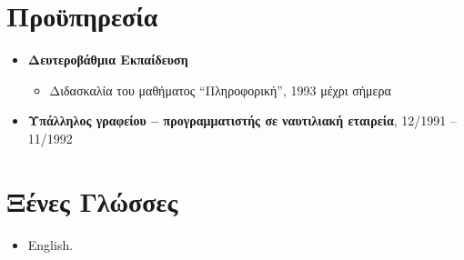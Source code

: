 \documentclass[%
    11pt,
  oneside
  ]{memoir}
\let\oldsection\section
\renewcommand{\section}[1]{%
  \oldsection{#1}
  \leavevmode
  \par
  \vspace{\dimexpr-\baselineskip-\parskip}
}
\begin{document}
\hypertarget{ux3c0ux3c1ux3bfux3cbux3c0ux3b7ux3c1ux3b5ux3c3ux3afux3b1}{%
\section{Προϋπηρεσία}\label{ux3c0ux3c1ux3bfux3cbux3c0ux3b7ux3c1ux3b5ux3c3ux3afux3b1}}

\begin{itemize}
\tightlist
\item
  \textbf{Δευτεροβάθμια Εκπαίδευση}

  \begin{itemize}
  \tightlist
  \item
    Διδασκαλία του μαθήματος ``Πληροφορική'', 1993 μέχρι σήμερα
  \end{itemize}
\item
  \textbf{Υπάλληλος γραφείου -- προγραμματιστής σε ναυτιλιακή εταιρεία},
  12/1991 -- 11/1992
\end{itemize}

\hypertarget{ux3beux3adux3bdux3b5ux3c2-ux3b3ux3bbux3ceux3c3ux3c3ux3b5ux3c2}{%
\section{Ξένες
Γλώσσες}\label{ux3beux3adux3bdux3b5ux3c2-ux3b3ux3bbux3ceux3c3ux3c3ux3b5ux3c2}}

\begin{itemize}
\tightlist
\item
  English.
\end{itemize}
\end{document}
